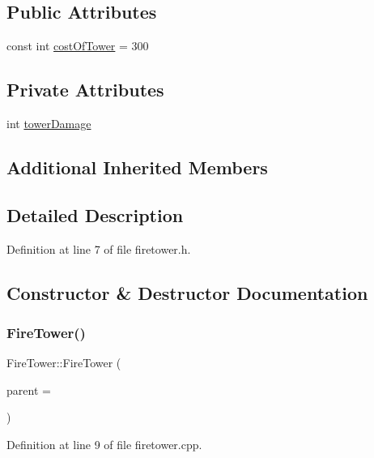 \subsection*{Public Attributes}
\begin{DoxyCompactItemize}
\item 
const int \hyperlink{class_fire_tower_ae05eab1ea0a68b5109ee91771d3c8569}{cost\+Of\+Tower} = 300
\end{DoxyCompactItemize}
\subsection*{Private Attributes}
\begin{DoxyCompactItemize}
\item 
int \hyperlink{class_fire_tower_a59a01cc273823ea5451179dbc1f4aded}{tower\+Damage}
\end{DoxyCompactItemize}
\subsection*{Additional Inherited Members}


\subsection{Detailed Description}


Definition at line 7 of file firetower.\+h.



\subsection{Constructor \& Destructor Documentation}
\mbox{\label{class_fire_tower_ad375e5ef0c469832741f6a541f3caae1}} 
\subsubsection{\texorpdfstring{Fire\+Tower()}{FireTower()}}
{\footnotesize\ttfamily Fire\+Tower\+::\+Fire\+Tower (\begin{DoxyParamCaption}\item[{Q\+Graphics\+Item $\ast$}]{parent = {} }\end{DoxyParamCaption})}



Definition at line 9 of file firetower.\+cpp.


